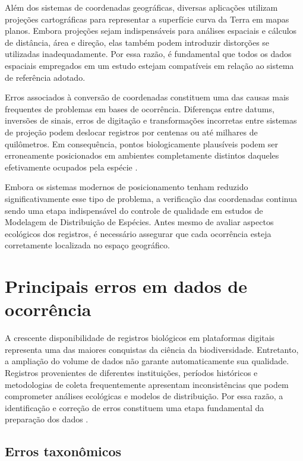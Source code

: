 Além dos sistemas de coordenadas geográficas, diversas aplicações utilizam projeções cartográficas para representar a superfície curva da Terra em mapas planos. Embora projeções sejam indispensáveis para análises espaciais e cálculos de distância, área e direção, elas também podem introduzir distorções se utilizadas inadequadamente. Por essa razão, é fundamental que todos os dados espaciais empregados em um estudo estejam compatíveis em relação ao sistema de referência adotado.

Erros associados à conversão de coordenadas constituem uma das causas mais frequentes de problemas em bases de ocorrência. Diferenças entre datums, inversões de sinais, erros de digitação e transformações incorretas entre sistemas de projeção podem deslocar registros por centenas ou até milhares de quilômetros. Em consequência, pontos biologicamente plausíveis podem ser erroneamente posicionados em ambientes completamente distintos daqueles efetivamente ocupados pela espécie \parencite{zizka2019coordinatecleaner}.

Embora os sistemas modernos de posicionamento tenham reduzido significativamente esse tipo de problema, a verificação das coordenadas continua sendo uma etapa indispensável do controle de qualidade em estudos de Modelagem de Distribuição de Espécies. Antes mesmo de avaliar aspectos ecológicos dos registros, é necessário assegurar que cada ocorrência esteja corretamente localizada no espaço geográfico.

\section{Principais erros em dados de ocorrência}

A crescente disponibilidade de registros biológicos em plataformas digitais representa uma das maiores conquistas da ciência da biodiversidade. Entretanto, a ampliação do volume de dados não garante automaticamente sua qualidade. Registros provenientes de diferentes instituições, períodos históricos e metodologias de coleta frequentemente apresentam inconsistências que podem comprometer análises ecológicas e modelos de distribuição. Por essa razão, a identificação e correção de erros constituem uma etapa fundamental da preparação dos dados \parencite{peterson2011ecological,zizka2019coordinatecleaner}.

\subsection{Erros taxonômicos}

